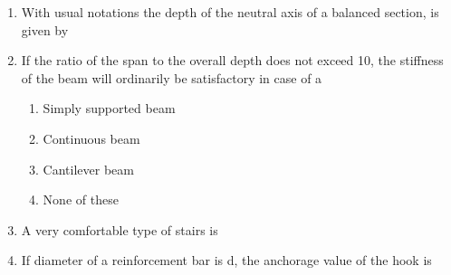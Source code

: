 \documentclass[11pt,a4paper]{article}
\begin{document}
\begin{enumerate}
\item{With usual notations the depth of the neutral axis of a balanced section, is given by}
\\
\item{If the ratio of the span to the overall depth does not exceed 10, the stiffness of the beam will ordinarily be satisfactory in case of a}
\begin{enumerate}[label=\Alph*.]
\item{Simply supported beam}
\item{Continuous beam}
\item{Cantilever beam}
\item{None of these}
\end{enumerate}
\item{A very comfortable type of stairs is}
\\
\item{If diameter of a reinforcement bar is d, the anchorage value of the hook is}
\\
\end{enumerate}
\end{document}

